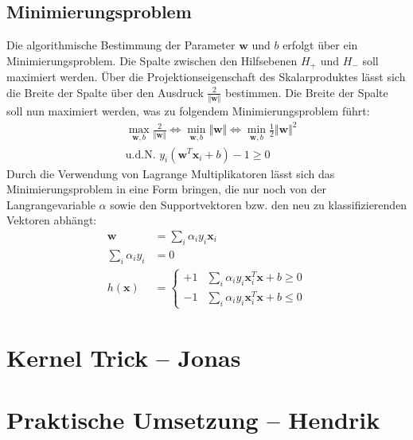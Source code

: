 \documentclass[10pt,a4paper]{scrartcl}
\begin{document}
\begin{multicols}{2}
            \subsection{Minimierungsproblem}
                Die algorithmische Bestimmung der Parameter $\boldsymbol{w}$ und $b$ erfolgt über ein Minimierungsproblem. Die Spalte zwischen den Hilfsebenen $H_+$ und $H_-$ soll maximiert werden. Über die Projektionseigenschaft des Skalarproduktes lässt sich die Breite der Spalte über den Ausdruck $\frac{2}{\Vert \boldsymbol{w} \Vert}$ bestimmen. Die Breite der Spalte soll nun maximiert werden, was zu folgendem Minimierungsproblem führt:
                \begin{align*}
                    & \max_{\boldsymbol{w}, b} \frac{2}{\Vert \boldsymbol{w} \Vert} \Leftrightarrow \min_{\boldsymbol{w}, b} \Vert \boldsymbol{w} \Vert \Leftrightarrow \min_{\boldsymbol{w}, b} \frac{1}{2} \Vert \boldsymbol{w} \Vert^2 \\
                    & \text{u.d.N. } y_i ( \boldsymbol{w}^T \boldsymbol{x}_i + b ) - 1 \geq 0
                \end{align*}
                Durch die Verwendung von Lagrange Multiplikatoren lässt sich das Minimierungsproblem in eine Form bringen, die nur noch von der Langrangevariable $\alpha$ sowie den Supportvektoren bzw. den neu zu klassifizierenden Vektoren abhängt:
                \begin{align*}
                    \boldsymbol{w} &= \sum_i \alpha_i y_i \boldsymbol{x}_i \\
                    \sum_i \alpha_i y_i &= 0 \\
                    h(\boldsymbol{x}) &= \begin{cases}
                        +1 & \sum_i \alpha_i y_i \boldsymbol{x}_i^T \boldsymbol{x} + b \geq 0 \\
                        -1 & \sum_i \alpha_i y_i \boldsymbol{x}_i^T \boldsymbol{x} + b \leq 0
                    \end{cases}
                \end{align*}
        \section{Kernel Trick -- Jonas}

        \section{Praktische Umsetzung -- Hendrik}


    \end{multicols}
\end{document}
